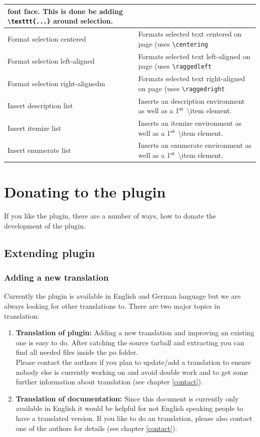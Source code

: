 \documentclass[%
a4paper,%
10pt,%
oneside,%
DIV18,
headsepline,
plainheadsepline,
footsepline,
plainfootsepline,
bibtotoc,%
liststotoc,%
BCOR12mm,%
halfparskip,%
openany,%
]{scrartcl}
\newcommand{\up}[1]{\ensuremath{^\textrm{\scriptsize#1}}}
\begin{document}
\begin{table}[H]
\begin{tabular}{l|p{9cm}}
font face. This is done be adding \texttt{\textbackslash texttt\{...\}} around
selection.\\\hline
Format selection centered & Formats selected text centered on page (uses \texttt{\textbackslash{}centering} \\\hline
Format selection left-aligned & Formats selected text left-aligned on page (uses \texttt{\textbackslash{}raggedleft} \\\hline
Format selection right-alignedm & Formats selected text right-aligned on page (uses \texttt{\textbackslash{}raggedright}\\\hline
Insert description list & Inserts an description environment as well as a 1\up{st} \textbackslash{}item element.\\\hline
Insert itemize list & Inserts an itemize environment as well as a 1\up{st} \textbackslash{}item element.\\\hline
Insert enumerate list & Inserts an enumerate environment as well as a 1\up{st} \textbackslash{}item element.\\\hline

\end{tabular}
\end{table}

\newpage
\section{Donating to the plugin}
If you like the plugin, there are a number of ways, how to donate the
development of the plugin.

\subsection{Extending plugin}

\subsubsection{Adding a new translation}
\label{sec:translating}
Currently the plugin is available in English and German language but
we are always looking for other translations to. There are two major
topics in translation:

\begin{enumerate}
\item \textbf{Translation of plugin:}
	   Adding a new translation and improving an existing one is easy to
	   do. After catching the source tarball and extracting you can find
	   all needed files inside the po folder. \\
	   Please contact the authors if you plan to update/add a translation
	   to ensure nobody else is currently working on and avoid double
	   work and to get some further information about translation (see
	   chapter \ref{contact}).
\item \textbf{Translation of documentation:}
	   Since this document is currently only available in English it
	   would be helpful for not English speaking people to have a
	   translated version. If you like to do an translation, please
	   also contact one of the authors for details (see chapter \ref{contact}).
\end{enumerate}
\end{document}
